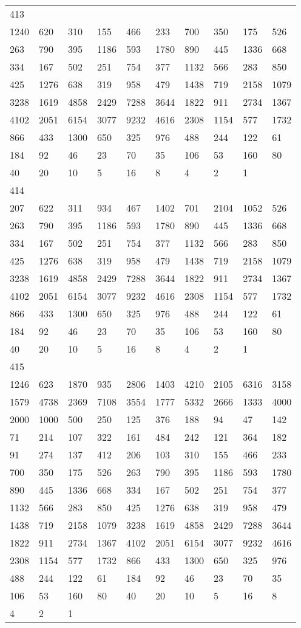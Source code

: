 \begin{longtable}{*{10}{l}}
413&&&&&&&&&\\
1240& 620& 310& 155& 466& 233& 700& 350& 175& 526\\
263& 790& 395& 1186& 593& 1780& 890& 445& 1336& 668\\
334& 167& 502& 251& 754& 377& 1132& 566& 283& 850\\
425& 1276& 638& 319& 958& 479& 1438& 719& 2158& 1079\\
3238& 1619& 4858& 2429& 7288& 3644& 1822& 911& 2734& 1367\\
4102& 2051& 6154& 3077& 9232& 4616& 2308& 1154& 577& 1732\\
866& 433& 1300& 650& 325& 976& 488& 244& 122& 61\\
184& 92& 46& 23& 70& 35& 106& 53& 160& 80\\
40& 20& 10& 5& 16& 8& 4& 2& 1& \\

414&&&&&&&&&\\
207& 622& 311& 934& 467& 1402& 701& 2104& 1052& 526\\
263& 790& 395& 1186& 593& 1780& 890& 445& 1336& 668\\
334& 167& 502& 251& 754& 377& 1132& 566& 283& 850\\
425& 1276& 638& 319& 958& 479& 1438& 719& 2158& 1079\\
3238& 1619& 4858& 2429& 7288& 3644& 1822& 911& 2734& 1367\\
4102& 2051& 6154& 3077& 9232& 4616& 2308& 1154& 577& 1732\\
866& 433& 1300& 650& 325& 976& 488& 244& 122& 61\\
184& 92& 46& 23& 70& 35& 106& 53& 160& 80\\
40& 20& 10& 5& 16& 8& 4& 2& 1& \\

415&&&&&&&&&\\
1246& 623& 1870& 935& 2806& 1403& 4210& 2105& 6316& 3158\\
1579& 4738& 2369& 7108& 3554& 1777& 5332& 2666& 1333& 4000\\
2000& 1000& 500& 250& 125& 376& 188& 94& 47& 142\\
71& 214& 107& 322& 161& 484& 242& 121& 364& 182\\
91& 274& 137& 412& 206& 103& 310& 155& 466& 233\\
700& 350& 175& 526& 263& 790& 395& 1186& 593& 1780\\
890& 445& 1336& 668& 334& 167& 502& 251& 754& 377\\
1132& 566& 283& 850& 425& 1276& 638& 319& 958& 479\\
1438& 719& 2158& 1079& 3238& 1619& 4858& 2429& 7288& 3644\\
1822& 911& 2734& 1367& 4102& 2051& 6154& 3077& 9232& 4616\\
2308& 1154& 577& 1732& 866& 433& 1300& 650& 325& 976\\
488& 244& 122& 61& 184& 92& 46& 23& 70& 35\\
106& 53& 160& 80& 40& 20& 10& 5& 16& 8\\
4& 2& 1& \\


\end{longtable}
